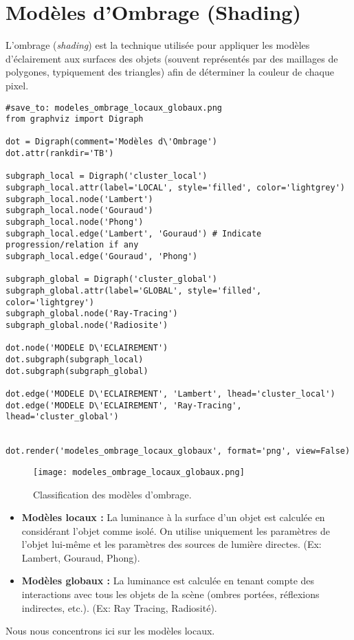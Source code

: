 \documentclass{article}
\begin{document}
\section{Modèles d'Ombrage (Shading)}

L'ombrage (\textit{shading}) est la technique utilisée pour appliquer les modèles d'éclairement aux surfaces des objets (souvent représentés par des maillages de polygones, typiquement des triangles) afin de déterminer la couleur de chaque pixel.

\begin{verbatim}
#save_to: modeles_ombrage_locaux_globaux.png
from graphviz import Digraph

dot = Digraph(comment='Modèles d\'Ombrage')
dot.attr(rankdir='TB')

subgraph_local = Digraph('cluster_local')
subgraph_local.attr(label='LOCAL', style='filled', color='lightgrey')
subgraph_local.node('Lambert')
subgraph_local.node('Gouraud')
subgraph_local.node('Phong')
subgraph_local.edge('Lambert', 'Gouraud') # Indicate progression/relation if any
subgraph_local.edge('Gouraud', 'Phong')

subgraph_global = Digraph('cluster_global')
subgraph_global.attr(label='GLOBAL', style='filled', color='lightgrey')
subgraph_global.node('Ray-Tracing')
subgraph_global.node('Radiosite')

dot.node('MODELE D\'ECLAIREMENT')
dot.subgraph(subgraph_local)
dot.subgraph(subgraph_global)

dot.edge('MODELE D\'ECLAIREMENT', 'Lambert', lhead='cluster_local')
dot.edge('MODELE D\'ECLAIREMENT', 'Ray-Tracing', lhead='cluster_global')


dot.render('modeles_ombrage_locaux_globaux', format='png', view=False)
\end{verbatim}

\begin{figure}[H]
\centering
\texttt{[image: modeles\_ombrage\_locaux\_globaux.png]}
\caption{Classification des modèles d'ombrage.}
\label{fig:modeles_ombrage_locaux_globaux}
\end{figure}

\begin{itemize}
    \item \textbf{Modèles locaux :} La luminance à la surface d'un objet est calculée en considérant l'objet comme isolé. On utilise uniquement les paramètres de l'objet lui-même et les paramètres des sources de lumière directes. (Ex: Lambert, Gouraud, Phong).
    \item \textbf{Modèles globaux :} La luminance est calculée en tenant compte des interactions avec tous les objets de la scène (ombres portées, réflexions indirectes, etc.). (Ex: Ray Tracing, Radiosité).
\end{itemize}
Nous nous concentrons ici sur les modèles locaux.
\end{document}

